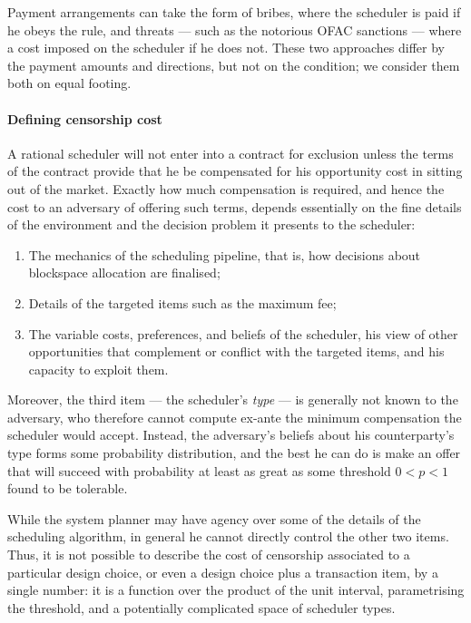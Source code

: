 Payment arrangements can take the form of bribes, where the scheduler is paid if he obeys the rule, and threats --- such as the notorious OFAC sanctions \cite{wright2022defi} --- where a cost imposed on the scheduler if he does not.
%
These two approaches differ by the payment amounts and directions, but not on the condition; we consider them both on equal footing.



\paragraph{Defining censorship cost}
%
A rational scheduler will not enter into a contract for exclusion unless the terms of the contract provide that he be compensated for his opportunity cost in sitting out of the market.
%
Exactly how much compensation is required, and hence the cost to an adversary of offering such terms, depends essentially on the fine details of the environment and the decision problem it presents to the scheduler:
%
\begin{enumerate}

  \item 
    The mechanics of the scheduling pipeline, that is, how decisions about blockspace allocation are finalised;
  \item 
    Details of the targeted items such as the maximum fee;
  \item
    The variable costs, preferences, and beliefs of the scheduler, his view of other opportunities that complement or conflict with the targeted items, and his capacity to exploit them.
\end{enumerate}
%
Moreover, the third item --- the scheduler's \emph{type} --- is generally not known to the adversary, who therefore cannot compute ex-ante the minimum compensation the scheduler would accept.
%
Instead, the adversary's beliefs about his counterparty's type forms some probability distribution, and the best he can do is make an offer that will succeed with probability at least as great as some threshold $0<p<1$ found to be tolerable.

While the system planner may have agency over some of the details of the scheduling algorithm, in general he cannot directly control the other two items.
%
Thus, it is not possible to describe the cost of censorship associated to a particular design choice, or even a design choice plus a transaction item, by a single number: it is a function over the product of the unit interval, parametrising the threshold, and a potentially complicated space of scheduler types.




